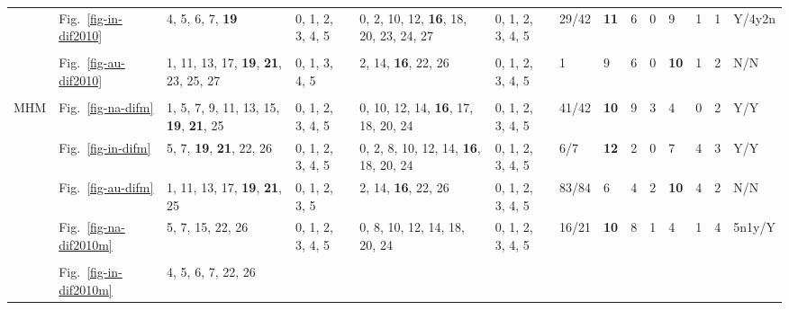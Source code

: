 \begin{table*}
{\begin{tabular}{l|l|l|l|l|l|l|l|l|l|l|l|l|l}
& Fig.~\ref{fig-in-dif2010} & \multirow{2}{*}{\parbox{2cm}{4, 5, 6, 7,
  \textbf{19}}} & \multirow{2}{*}{\parbox{1cm}{0, 1, 2, 3, 4, 5}} &
  \multirow{2}{*}{\parbox{2.4cm}{0, 2, 10, 12, \textbf{16}, 18, 20, 23, 24, 27}} &
  \multirow{2}{*}{\parbox{1cm}{0, 1, 2, 3, 4, 5}} & 29/42 & \textbf{11} & 6 & 0
  & 9 & 1 & 1 & Y/4y2n \\ \\ \cline{2-14}
& Fig.~\ref{fig-au-dif2010} & \multirow{2}{*}{\parbox{2cm}{1, 11, 13, 17,
\textbf{19}, \textbf{21}, 23, 25, 27}} & \multirow{2}{*}{\parbox{1cm}{0, 1, 3, 4, 5}} &
  \multirow{2}{*}{\parbox{2cm}{2, 14, \textbf{16}, 22, 26}} &
  \multirow{2}{*}{\parbox{1cm}{0, 1, 2, 3, 4, 5}} & 1 & 9 & 6 & 0 & \textbf{10}
  & 1 & 2 & N/N \\ \\ \hline
\multirow{12}{*}{MHM}
& Fig.~\ref{fig-na-difm} & \multirow{2}{*}{\parbox{2cm}{1, 5, 7, 9, 11, 13, 15,
  \textbf{19}, \textbf{21}, 25}} & \multirow{2}{*}{\parbox{1cm}{0, 1, 2, 3, 4, 5}} &
  \multirow{2}{*}{\parbox{2.2cm}{0, 10, 12, 14, \textbf{16}, 17, 18, 20, 24}} &
  \multirow{2}{*}{\parbox{1cm}{0, 1, 2, 3, 4, 5}} & 41/42 & \textbf{10} & 9 & 3
  & 4 & 0 & 2 & Y/Y \\ \\ \cline{2-14}
& Fig.~\ref{fig-in-difm} & \multirow{2}{*}{\parbox{2cm}{5, 7, \textbf{19}, \textbf{21}, 22, 26}} &
  \multirow{2}{*}{\parbox{1cm}{0, 1, 2, 3, 4, 5}} &
  \multirow{2}{*}{\parbox{2.4cm}{0, 2, 8, 10, 12, 14, \textbf{16}, 18, 20, 24}} &
  \multirow{2}{*}{\parbox{1cm}{0, 1, 2, 3, 4, 5}} & 6/7 & \textbf{12} & 2 & 0 &
  7 & 4 & 3 & Y/Y \\ \\ \cline{2-14}
& Fig.~\ref{fig-au-difm} & \multirow{2}{*}{\parbox{2cm}{1, 11, 13, 17,
  \textbf{19}, \textbf{21}, 25}} & \multirow{2}{*}{\parbox{1cm}{0, 1, 2, 3, 5}} &
  \multirow{2}{*}{\parbox{2.4cm}{2, 14, \textbf{16}, 22, 26}} &
  \multirow{2}{*}{\parbox{1cm}{0, 1, 2, 3, 4, 5}} & 83/84 & 6 & 4 & 2 &
  \textbf{10} & 4 & 2 & N/N \\ \\ \cline{2-14}
& Fig.~\ref{fig-na-dif2010m} & \multirow{2}{*}{\parbox{2cm}{5, 7,
  15, 22, 26}} & \multirow{2}{*}{\parbox{1cm}{0, 1, 2, 3, 4, 5}} &
  \multirow{2}{*}{\parbox{2.4cm}{0, 8, 10, 12, 14, 18, 20, 24}} &
  \multirow{2}{*}{\parbox{1cm}{0, 1, 2, 3, 4, 5}} & 16/21 & \textbf{10} & 8 & 1
  & 4 & 1 & 4 & 5n1y/Y \\ \\ \cline{2-14}
& Fig.~\ref{fig-in-dif2010m} & \multirow{2}{*}{\parbox{2cm}{4, 5, 6, 7, 22, 26}} &

\end{tabular}}
\end{table*}
